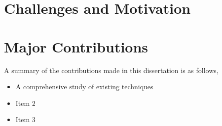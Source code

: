 \section{Challenges and Motivation}
\label{sec:ch1_challenges}



\section{Major Contributions}
\label{sec:ch1_contributions}
 A summary of the contributions made in this dissertation is as follows,

\begin{itemize}
    \item A comprehensive study of existing techniques
    \item Item 2
    \item Item 3
    
\end{itemize}

